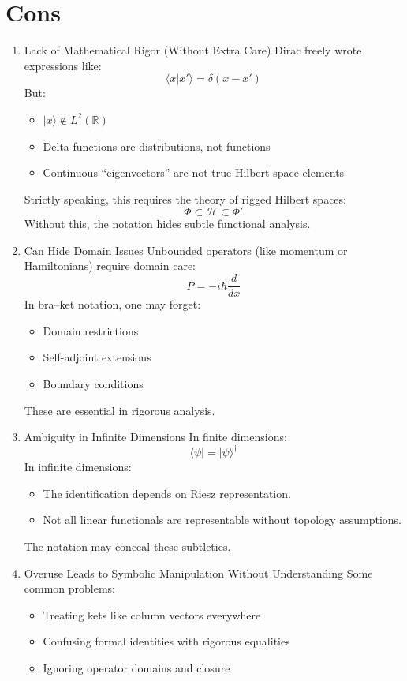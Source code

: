 \documentclass[12pt]{article}
\begin{document}
\section{ Cons}\label{cons}
\begin{enumerate}
   \item
Lack of Mathematical Rigor (Without Extra Care)
Dirac freely wrote expressions like:
\[\langle x|x' \rangle = \delta(x-x')\]
But:
\begin{itemize}
\item
  \(|x\rangle \notin L^2(\mathbb{R})\)
\item
  Delta functions are distributions, not functions
\item
  Continuous ``eigenvectors'' are not true Hilbert space elements
\end{itemize}
Strictly speaking, this requires the theory of rigged Hilbert spaces:
\[\Phi \subset \mathcal{H} \subset \Phi'\]
Without this, the notation hides subtle functional analysis.
   \item
Can Hide Domain Issues
Unbounded operators (like momentum or Hamiltonians) require domain care:
\[P = -i\hbar \frac{d}{dx}\]
In bra--ket notation, one may forget:
\begin{itemize}
\item
  Domain restrictions
\item
  Self-adjoint extensions
\item
  Boundary conditions
\end{itemize}
These are essential in rigorous analysis.
   \item
Ambiguity in Infinite Dimensions
In finite dimensions:
\[\langle \psi| = |\psi\rangle^\dagger\]
In infinite dimensions:
\begin{itemize}
\item
  The identification depends on Riesz representation.
\item
  Not all linear functionals are representable without topology
  assumptions.
\end{itemize}
The notation may conceal these subtleties.
   \item
 Overuse Leads to Symbolic Manipulation Without Understanding
Some common problems:
\begin{itemize}
\item
  Treating kets like column vectors everywhere
\item
  Confusing formal identities with rigorous equalities
\item
  Ignoring operator domains and closure
\end{itemize}

\end{enumerate}
\end{document}
